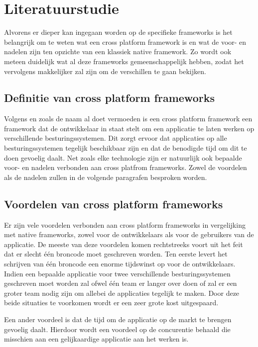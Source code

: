 \section{Literatuurstudie}
\label{sec:literatuurstudie}

Alvorens er dieper kan ingegaan worden op de specifieke frameworks is het belangrijk om te weten wat een cross platform framework is en wat de voor- en nadelen zijn ten opzichte van een klassiek native framework. Zo wordt ook meteen duidelijk wat al deze frameworks gemeenschappelijk hebben, zodat het vervolgens makkelijker zal zijn om de verschillen te gaan bekijken.

\subsection{Definitie van cross platform frameworks}

Volgens \textcite{El-Kassas2014} en zoals de naam al doet vermoeden is een cross platform framework een framework dat de ontwikkelaar in staat stelt om een applicatie te laten werken op verschillende besturingssystemen. Dit zorgt ervoor dat applicaties op alle besturingssystemen tegelijk beschikbaar zijn en dat de benodigde tijd om dit te doen gevoelig daalt. Net zoals elke technologie zijn er natuurlijk ook bepaalde voor- en nadelen verbonden aan cross platfrom frameworks. Zowel de voordelen als de nadelen zullen in de volgende paragrafen besproken worden.

\subsection{Voordelen van cross platform frameworks}

Er zijn vele voordelen verbonden aan cross platform frameworks in vergelijking met native frameworks, zowel voor de ontwikkelaars als voor de gebruikers van de applicatie. De meeste van deze voordelen komen rechtstreeks voort uit het feit dat er slecht één broncode moet geschreven worden. Ten eerste levert het schrijven van één broncode een enorme tijdswinst op voor de ontwikkelaars. Indien een bepaalde applicatie voor twee verschillende besturingssystemen geschreven moet worden zal ofwel één team er langer over doen of zal er een groter team nodig zijn om allebei de applicaties tegelijk te maken. Door deze beide situaties te voorkomen wordt er een zeer grote kost uitgespaard. 

Een ander voordeel is dat de tijd om de applicatie op de markt te brengen gevoelig daalt. Hierdoor wordt een voordeel op de concurentie behaald die misschien aan een gelijkaardige applicatie aan het werken is. 

